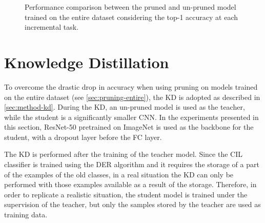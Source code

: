 \begin{figure}[H]
	\centering
	\caption{Performance comparison between the pruned and un-pruned model trained on the entire dataset considering the top-1 accuracy at each incremental task.}%
	\label{fig:exp7}
\end{figure}



\section{Knowledge Distillation}
\label{sec:exp-kd}
To overcome the drastic drop in accuracy when using pruning on models trained on the entire dataset (see \autoref{sec:pruning-entire}), the KD is adopted as described in \autoref{sec:method-kd}.
During the KD, an un-pruned model is used as the teacher, while the student is a significantly smaller CNN. In the experiments presented in this section, ResNet-50 pretrained on ImageNet is used as the backbone for the student, with a dropout layer before the FC layer.

The KD is performed after the training of the teacher model.
Since the CIL classifier is trained using the DER algorithm and it requires the storage of a part of the examples of the old classes, in a real situation the KD can only be performed with those examples available as a result of the storage.
Therefore, in order to replicate a realistic situation, the student model is trained under the supervision of the teacher, but only the samples stored by the teacher are used as training data.

